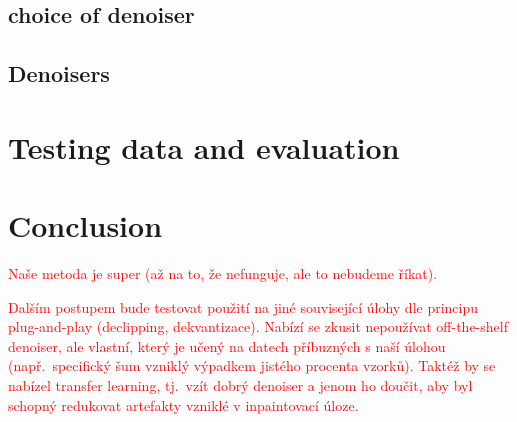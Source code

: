 \documentclass[conference]{IEEEtran}
\newcommand{\todo}[1]{\textcolor{red}{#1}}
\begin{document}
\subsection{choice of denoiser}

\subsection{Denoisers}

\section{Testing data and evaluation}\label{sec:eval}


\section{Conclusion}

\todo{Naše metoda je super (až na to, že nefunguje, ale to nebudeme říkat).}

\todo{Dalším postupem bude testovat použití na jiné související úlohy dle principu plug-and-play (declipping, dekvantizace). Nabízí se zkusit nepoužívat off-the-shelf denoiser, ale vlastní, který je učený na datech příbuzných s naší úlohou (např.\ specifický šum vzniklý výpadkem jistého procenta vzorků). Taktéž by se nabízel transfer learning, tj.\ vzít dobrý denoiser a jenom ho doučit, aby byl schopný redukovat artefakty vzniklé v inpaintovací úloze.}

%



\end{document}
